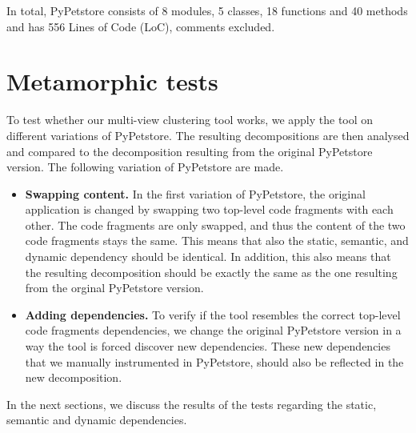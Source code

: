 In total, PyPetstore consists of 8 modules, 5 classes, 18 functions and 40 methods and has 556 Lines of Code (LoC), comments excluded. 

\section{Metamorphic tests}
To test whether our multi-view clustering tool works, we apply the tool on different variations of PyPetstore. The resulting decompositions are then analysed and compared to the decomposition resulting from the original PyPetstore version. The following variation of PyPetstore are made.

\begin{itemize}
    \item \textbf{Swapping content.} In the first variation of PyPetstore, the original application is changed by swapping two top-level code fragments with each other. The code fragments are only swapped, and thus the content of the two code fragments stays the same. This means that also the static, semantic, and dynamic dependency should be identical. In addition, this also means that the resulting decomposition should be exactly the same as the one resulting from the orginal PyPetstore version.
    \item \textbf{Adding dependencies.} To verify if the tool resembles the correct top-level code fragments dependencies, we change the original PyPetstore version in a way the tool is forced discover new dependencies. These new dependencies that we manually instrumented in PyPetstore, should also be reflected in the new decomposition. 
\end{itemize}

In the next sections, we discuss the results of the tests regarding the static, semantic and dynamic dependencies.

